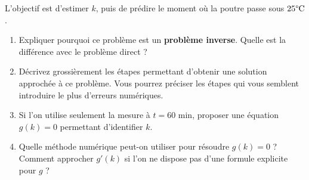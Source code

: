 L'objectif est d'estimer $k$, puis de prédire le moment où la poutre passe sous $25\text{\textdegree C}$.

\begin{enumerate}
    \item Expliquer pourquoi ce problème est un \textbf{problème inverse}. Quelle est la différence avec le problème direct ?
    \item Décrivez grossièrement les étapes permettant d'obtenir une solution approchée à ce problème. 
    Vous pourrez préciser les étapes qui vous semblent introduire le plus d'erreurs numériques.
    \item Si l'on utilise seulement la mesure à $t=60$ min, proposer une équation $g(k)=0$ permettant d'identifier $k$.
    \item Quelle méthode numérique peut-on utiliser pour résoudre $g(k)=0$ ? Comment approcher $g'(k)$ si l'on ne dispose pas d'une formule explicite pour $g$ ?
\end{enumerate}



